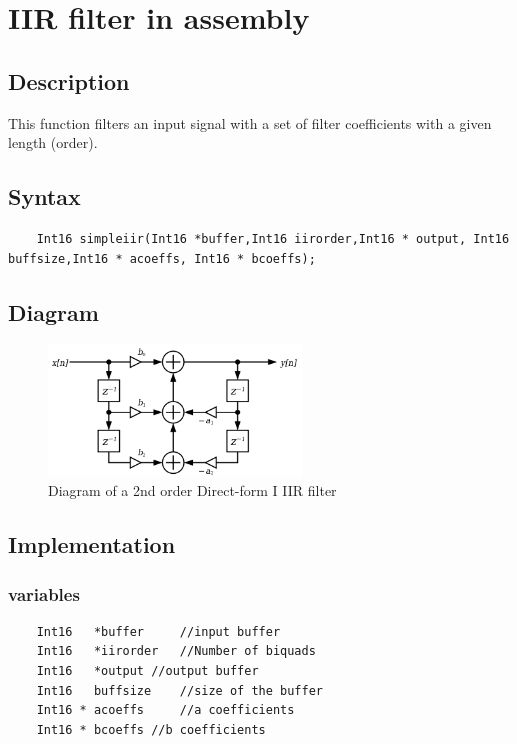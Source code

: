 
\section{IIR filter in assembly}

\subsection{Description}
This function filters an input signal with a set of filter coefficients with a given length (order).

\subsection{Syntax} 
\begin{lstlisting}
	Int16 simpleiir(Int16 *buffer,Int16 iirorder,Int16 * output, Int16 buffsize,Int16 * acoeffs, Int16 * bcoeffs);
\end{lstlisting}

\subsection{Diagram}
\begin{figure} [h]
	\centering
	\includegraphics[width=0.6\textwidth]{../Journal/Code/IIRfilter}
	\caption{Diagram of a 2nd order Direct-form I IIR filter}
	\label{Fig:FIR_filter}
\end{figure}


\subsection{Implementation}

\subsubsection{variables}
\begin{lstlisting}
	Int16 	*buffer 	//input buffer
	Int16	*iirorder	//Number of biquads
	Int16	*output	//output buffer
	Int16 	buffsize	//size of the buffer
	Int16 * acoeffs		//a coefficients
	Int16 * bcoeffs	//b coefficients
\end{lstlisting}

